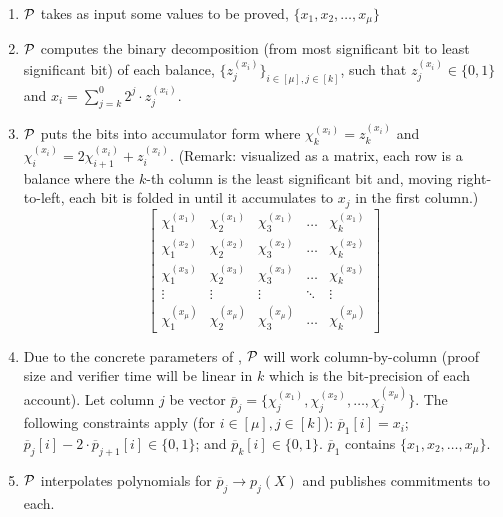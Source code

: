 

\begin{Protocol*}[t!]
\begin{mdframed}
\footnotesize


\begin{enumerate}
    \item $\mathcal{P}$ takes as input some values to be proved, $\{x_1,x_2,\dots,x_\mu\}$
    \item $\mathcal{P}$ computes the binary decomposition (from most significant bit to least significant bit) of each balance, $\{z_j^{(x_i)}\}_{i\in[\mu],j\in[k]}$, such that $z_j^{(x_i)}\in\{0,1\}$ and $x_i=\sum_{j=k}^{0}2^j\cdot{z_j^{(x_i)}}$.
    \item $\mathcal{P}$ puts the bits into accumulator form where $\chi_k^{(x_i)}=z_k^{(x_i)}$ and $\chi_i^{(x_i)}=2\chi_{i+1}^{(x_i)}+z_i^{(x_i)}$.  (Remark: visualized as a matrix, each row is a balance where the $k$-th column is the least significant bit and, moving right-to-left, each bit is folded in until it accumulates to $x_j$ in the first column.)
    \[\begin{bmatrix}
        \chi_1^{(x_1)} & \chi_2^{(x_1)} & \chi_3^{(x_1)} & \dots & \chi_k^{(x_1)} \\[3pt]
        \chi_1^{(x_2)} & \chi_2^{(x_2)} & \chi_3^{(x_2)} & \dots & \chi_k^{(x_2)} \\[3pt]
        \chi_1^{(x_3)} & \chi_2^{(x_3)} & \chi_3^{(x_3)} & \dots & \chi_k^{(x_3)} \\[3pt]
        \vdots & \vdots & \vdots & \ddots & \vdots \\[3pt]
        \chi_1^{(x_\mu)} & \chi_2^{(x_\mu)} & \chi_3^{(x_\mu)} & \dots & \chi_k^{(x_\mu)}
    \end{bmatrix}\]
    \item Due to the concrete parameters of \bls, $\mathcal{P}$ will work column-by-column (proof size and verifier time will be linear in $k$ which is the bit-precision of each account). Let column $j$ be vector $\overline{p}_j=\{\chi_j^{(x_1)},\chi_j^{(x_2)},\dots,\chi_j^{(x_\mu)}\}$. The following constraints apply (for $i\in[\mu],j\in[k]$):       $\overline{p}_1[i]=x_i$; $\overline{p}_j[i] - 2\cdot\overline{p}_{j+1}[i]\in\{0,1\}$; and $\overline{p}_k[i]\in\{0,1\}$. $\overline{p}_1$ contains $\{x_1,x_2,\dots,x_\mu\}$.
	\item $\mathcal{P}$ interpolates polynomials for $\overline{p}_j \rightarrow p_j(X)$ and publishes commitments to each.

\end{enumerate}
\end{mdframed}
\end{Protocol*}
